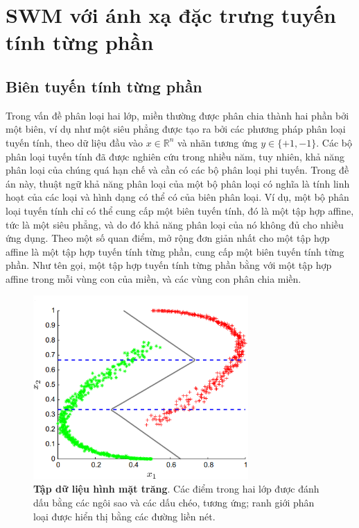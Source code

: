 \section{SWM với ánh xạ đặc trưng tuyến tính từng phần}
\subsection{Biên tuyến tính từng phần}
Trong vấn đề phân loại hai lớp, miền thường được phân chia thành hai phần bởi một biên, ví dụ như một siêu phẳng được tạo ra bởi các phương pháp phân loại tuyến tính, theo dữ liệu đầu vào \( x \in \mathbb{R}^n \) và nhãn tương ứng \( y \in \{+1, -1\} \). Các bộ phân loại tuyến tính đã được nghiên cứu trong nhiều năm, tuy nhiên, khả năng phân loại của chúng quá hạn chế và cần có các bộ phân loại phi tuyến. Trong đề án này, thuật ngữ khả năng phân loại của một bộ phân loại có nghĩa là tính linh hoạt của các loại và hình dạng có thể có của biên phân loại. Ví dụ, một bộ phân loại tuyến tính chỉ có thể cung cấp một biên tuyến tính, đó là một tập hợp affine, tức là một siêu phẳng, và do đó khả năng phân loại của nó không đủ cho nhiều ứng dụng. Theo một số quan điểm, mở rộng đơn giản nhất cho một tập hợp affine là một tập hợp tuyến tính từng phần, cung cấp một biên tuyến tính từng phần. Như tên gọi, một tập hợp tuyến tính từng phần bằng với một tập hợp affine trong mỗi vùng con của miền, và các vùng con phân chia miền.

\begin{figure}
    \centering
    \includegraphics[width=0.73\textwidth]{images/moon_data.png}
    \caption[Tập dữ liệu hình mặt trăng]{\textbf{Tập dữ liệu hình mặt trăng}. Các điểm trong hai lớp được đánh dấu bằng các ngôi sao và các dấu chéo, tương ứng; ranh giới phân loại được hiển thị bằng các đường liền nét.}
    \label{fig:moon_data}
\end{figure}

